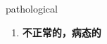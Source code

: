 
\begin{frame}
{\huge pathological}
\begin{center}
\begin{enumerate}\Large
  \item \textbf{不正常的，病态的}
\end{enumerate}
\end{center}
\end{frame}
